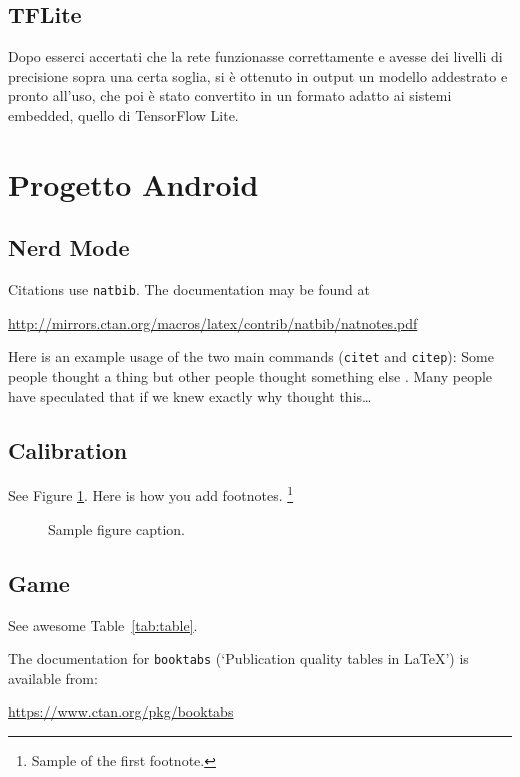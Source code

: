 \documentclass[11pt]{article}
\begin{document}
\subsection{TFLite}
Dopo esserci accertati che la rete funzionasse correttamente e avesse dei livelli di precisione sopra una certa soglia, si è ottenuto in output un modello addestrato
e pronto all’uso, che poi è stato convertito in un formato adatto ai sistemi embedded, quello di TensorFlow Lite.


\newpage
\section{Progetto Android}
\label{sec:others}

\subsection{Nerd Mode}
Citations use \verb+natbib+. The documentation may be found at
\begin{center}
	\url{http://mirrors.ctan.org/macros/latex/contrib/natbib/natnotes.pdf}
\end{center}

Here is an example usage of the two main commands (\verb+citet+ and \verb+citep+): Some people thought a thing \citep{kour2014real, hadash2018estimate} but other people thought something else \citep{kour2014fast}. Many people have speculated that if we knew exactly why \citet{kour2014fast} thought this\dots

\subsection{Calibration}
\lipsum[10]
See Figure \ref{fig:fig1}. Here is how you add footnotes. \footnote{Sample of the first footnote.}
\lipsum[11]

\begin{figure}
	\centering
	\fbox{\rule[-.5cm]{4cm}{4cm} \rule[-.5cm]{4cm}{0cm}}
	\caption{Sample figure caption.}
	\label{fig:fig1}
\end{figure}

\subsection{Game}
See awesome Table~\ref{tab:table}.

The documentation for \verb+booktabs+ (`Publication quality tables in LaTeX') is available from:
\begin{center}
	\url{https://www.ctan.org/pkg/booktabs}
\end{center}
\end{document}
